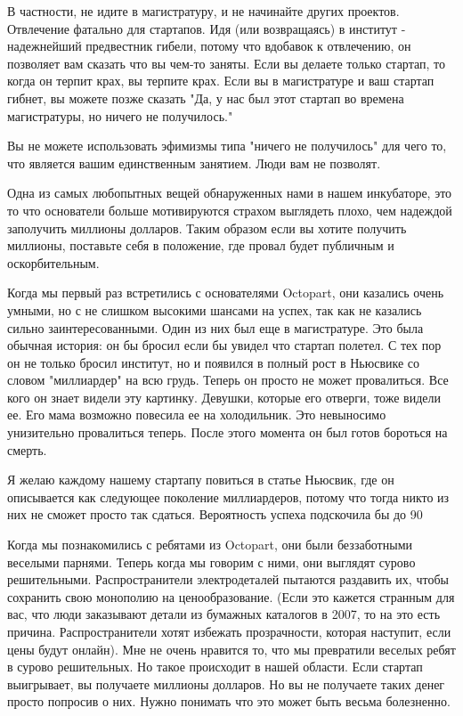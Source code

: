 \documentclass[ebook,12pt,oneside,openany]{memoir}
\begin{document}
В частности, не идите в магистратуру, и не начинайте других проектов.
Отвлечение фатально для стартапов. Идя (или возвращаясь) в институт -
надежнейший предвестник гибели, потому что вдобавок к отвлечению, он
позволяет вам сказать что вы чем-то заняты. Если вы делаете только
стартап, то когда он терпит крах, вы терпите крах. Если вы в
магистратуре и ваш стартап гибнет, вы можете позже сказать "Да, у нас
был этот стартап во времена магистратуры, но ничего не получилось."

Вы не можете использовать эфимизмы типа "ничего не получилось" для
чего то, что является вашим единственным занятием. Люди вам не
позволят.

Одна из самых любопытных вещей обнаруженных нами в нашем инкубаторе,
это то что основатели больше мотивируются страхом выглядеть плохо, чем
надеждой заполучить миллионы долларов. Таким образом если вы хотите
получить миллионы, поставьте себя в положение, где провал будет
публичным и оскорбительным.

Когда мы первый раз встретились с основателями Octopart, они казались
очень умными, но с не слишком высокими шансами на успех, так как не
казались сильно заинтересованными. Один из них был еще в магистратуре.
Это была обычная история: он бы бросил если бы увидел что стартап
полетел. С тех пор он не только бросил институт, но и появился в
полный рост в Ньюсвике со словом "миллиардер" на всю грудь. Теперь он
просто не может провалиться. Все кого он знает видели эту картинку.
Девушки, которые его отверги, тоже видели ее. Его мама возможно
повесила ее на холодильник. Это невыносимо унизительно провалиться
теперь. После этого момента он был готов бороться на смерть.

Я желаю каждому нашему стартапу повиться в статье Ньюсвик, где он
описывается как следующее поколение миллиардеров, потому что тогда
никто из них не сможет просто так сдаться. Вероятность успеха
подскочила бы до 90%

Когда мы познакомились с ребятами из Octopart, они были беззаботными
веселыми парнями. Теперь когда мы говорим с ними, они выглядят сурово
решительными. Распространители электродеталей пытаются раздавить их,
чтобы сохранить свою монополию на ценообразование. (Если это кажется
странным для вас, что люди заказывают детали из бумажных каталогов в
2007, то на это есть причина. Распространители хотят избежать
прозрачности, которая наступит, если цены будут онлайн). Мне не очень
нравится то, что мы превратили веселых ребят в сурово решительных. Но
такое происходит в нашей области. Если стартап выигрывает, вы
получаете миллионы долларов. Но вы не получаете таких денег просто
попросив о них. Нужно понимать что это может быть весьма болезненно.
\end{document}
